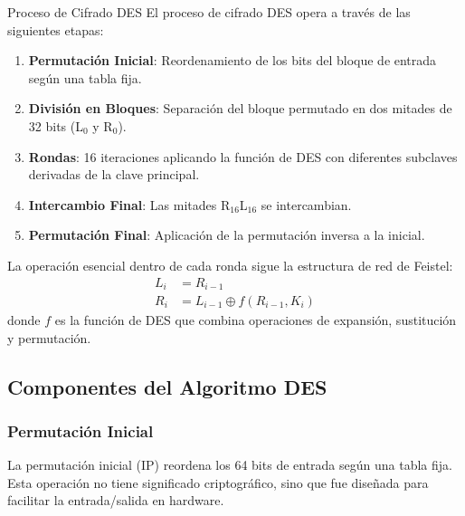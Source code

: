 
\begin{cryptomethod}{Proceso de Cifrado DES}
	El proceso de cifrado DES opera a través de las siguientes etapas:

	\begin{enumerate}
		\item \textbf{Permutación Inicial}: Reordenamiento de los bits del bloque de entrada según una tabla fija.
		\item \textbf{División en Bloques}: Separación del bloque permutado en dos mitades de 32 bits (L$_0$ y R$_0$).
		\item \textbf{Rondas}: 16 iteraciones aplicando la función de DES con diferentes subclaves derivadas de la clave principal.
		\item \textbf{Intercambio Final}: Las mitades R$_{16}$L$_{16}$ se intercambian.
		\item \textbf{Permutación Final}: Aplicación de la permutación inversa a la inicial.
	\end{enumerate}

	La operación esencial dentro de cada ronda sigue la estructura de red de Feistel:
	\begin{align}
		L_i & = R_{i-1}                        \\
		R_i & = L_{i-1} \oplus f(R_{i-1}, K_i)
	\end{align}
	donde $f$ es la función de DES que combina operaciones de expansión, sustitución y permutación.
\end{cryptomethod}

\subsection{Componentes del Algoritmo DES}

\subsubsection{Permutación Inicial}
La permutación inicial (IP) reordena los 64 bits de entrada según una tabla fija. Esta operación no tiene significado criptográfico, sino que fue diseñada para facilitar la entrada/salida en hardware.



